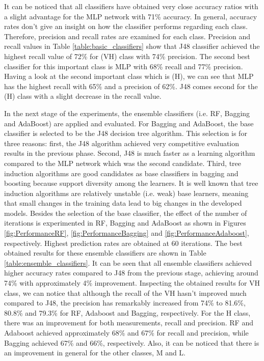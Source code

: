 \documentclass[a4paper,10pt,onecolumn,preprint,3p]{elsarticle}
\begin{document}
It can be noticed that all classifiers have obtained very close accuracy ratios with a slight advantage for the MLP network with 71\% accuracy. In general, accuracy rates don't give an insight on how the classifier performs regarding each class. Therefore, precision and recall rates are examined for each class. Precision and recall values in Table \ref{table:basic_classifiers} show that J48 classifier achieved the highest recall value of 72\% for (VH) class with 74\% precision. The second best classifier for this important class is MLP with 68\% recall and 77\% precision. Having a look at the second important class which is (H), we can see that MLP has the highest recall with 65\% and a precision of 62\%. J48 comes second for the (H) class with a slight decrease in the recall value.

In the next stage of the experiments, the ensemble classifiers (i.e. RF, Bagging and AdaBoost) are applied and evaluated. For Bagging and AdaBoost, the base classifier is selected to be the J48 decision tree algorithm. This selection is for three reasons: first, the J48 algorithm achieved very competitive evaluation results in the previous phase. Second, J48 is much faster as a learning algorithm compared to the MLP network which was the second candidate. Third, tree induction algorithms are good candidates as base classifiers in bagging and boosting because support diversity among the learners. It is well known that tree induction algorithms are relatively unstable (i.e. weak) base learners, meaning that small changes in the training data lead to big changes in the developed models. Besides the selection of the base classifier, the effect of the number of iterations is experimented in RF, Bagging and AdaBoost as shown in Figures \ref{fig:PerformanceRF}, \ref{fig:PerformanceBagging} and \ref{fig:PerformanceAdaboost}, respectively. Highest prediction rates are obtained at 60 iterations. The best obtained results for these ensemble classifiers are shown in Table \ref{table:ensemble_classifiers}. It can be seen that all ensemble classifiers achieved higher accuracy rates compared to J48 from the previous stage, achieving around 74\% with approximately 4\% improvement. Inspecting the obtained results for VH class, we can notice that although the recall of the VH hasn't improved much compared to J48, the precision has remarkably increased from 74\% to 81.6\%, 80.8\% and 79.3\% for RF, Adaboost and Bagging, respectively. For the H class, there was an improvement for both measurements, recall and precision. RF and Adaboost achieved approximately 68\% and 67\% for recall and precision, while Bagging achieved 67\% and 66\%, respectively. Also, it can be noticed that there is an improvement in general for the other classes, M and L.
\end{document}
